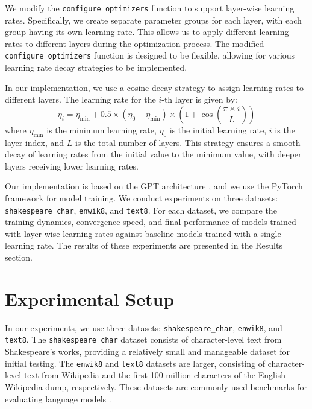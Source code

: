 \documentclass{article} %
\begin{document}
We modify the \texttt{configure\_optimizers} function to support layer-wise learning rates. Specifically, we create separate parameter groups for each layer, with each group having its own learning rate. This allows us to apply different learning rates to different layers during the optimization process. The modified \texttt{configure\_optimizers} function is designed to be flexible, allowing for various learning rate decay strategies to be implemented.

In our implementation, we use a cosine decay strategy to assign learning rates to different layers. The learning rate for the $i$-th layer is given by:
\[
\eta_i = \eta_{\text{min}} + 0.5 \times (\eta_0 - \eta_{\text{min}}) \times \left(1 + \cos\left(\frac{\pi \times i}{L}\right)\right)
\]
where $\eta_{\text{min}}$ is the minimum learning rate, $\eta_0$ is the initial learning rate, $i$ is the layer index, and $L$ is the total number of layers. This strategy ensures a smooth decay of learning rates from the initial value to the minimum value, with deeper layers receiving lower learning rates.

Our implementation is based on the GPT architecture \citep{radford2019language}, and we use the PyTorch framework \citep{paszke2019pytorch} for model training. We conduct experiments on three datasets: \texttt{shakespeare\_char}, \texttt{enwik8}, and \texttt{text8}. For each dataset, we compare the training dynamics, convergence speed, and final performance of models trained with layer-wise learning rates against baseline models trained with a single learning rate. The results of these experiments are presented in the Results section.

\section{Experimental Setup}
\label{sec:experimental}

In our experiments, we use three datasets: \texttt{shakespeare\_char}, \texttt{enwik8}, and \texttt{text8}. The \texttt{shakespeare\_char} dataset consists of character-level text from Shakespeare's works, providing a relatively small and manageable dataset for initial testing. The \texttt{enwik8} and \texttt{text8} datasets are larger, consisting of character-level text from Wikipedia and the first 100 million characters of the English Wikipedia dump, respectively. These datasets are commonly used benchmarks for evaluating language models \citep{karpathy2023nanogpt}.
\end{document}
